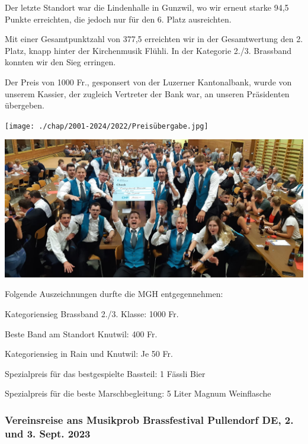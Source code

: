 \begin{history}
    Der letzte Standort war die Lindenhalle in Gunzwil, wo wir erneut starke
    94,5 Punkte erreichten, die jedoch nur für den 6. Platz ausreichten.

    Mit einer Gesamtpunktzahl von 377,5 erreichten wir in der Gesamtwertung den
    2. Platz, knapp hinter der Kirchenmusik Flühli. In der Kategorie 2./3.
    Brassband konnten wir den Sieg erringen.

    Der Preis von 1000 Fr., gesponsert von der Luzerner Kantonalbank, wurde von
    unserem Kassier, der zugleich Vertreter der Bank war, an unseren Präsidenten
    übergeben.

    \begin{MulticolFigure}
        \centering
        \texttt{[image: ./chap/2001-2024/2022/Preisübergabe.jpg]}
    \end{MulticolFigure}


    \begin{MulticolFigure}
        \centering
        \includegraphics[width=0.93\linewidth]{./chap/2001-2024/2022/Feier-Welle.jpg}
    \end{MulticolFigure}


    \noindent Folgende Auszeichnungen durfte die MGH entgegennehmen:

    Kategoriensieg Brassband 2./3. Klasse: 1000 Fr.

    Beste Band am Standort Knutwil: 400 Fr.

    Kategoriensieg in Rain und Knutwil: Je 50 Fr.

    Spezialpreis für das bestgespielte Bassteil: 1 Fässli Bier

    Spezialpreis für die beste Marschbegleitung: 5 Liter Magnum Weinflasche


    \subsubsection*{Vereinsreise ans Musikprob Brassfestival Pullendorf DE, 2. und 3. Sept. 2023}


\end{history}
